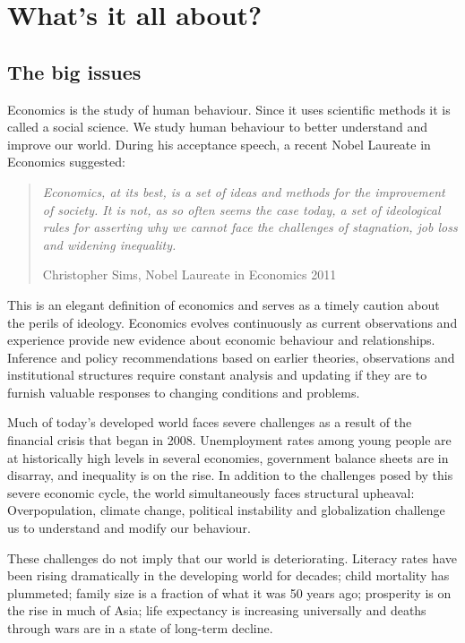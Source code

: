 \section{What's it all about?}\label{sec:ch1sec1}

\subsection*{The big issues}

Economics is the study of human behaviour. Since it uses scientific methods
it is called a social science. We study human behaviour to better understand
and improve our world. During his acceptance speech, a recent Nobel Laureate
in Economics suggested:

\begin{quote}
	\textit{Economics, at its best, is a set of ideas and methods for the
		improvement of society. It is not, as so often seems the case today, a set
		of ideological rules for asserting why we cannot face the challenges of
		stagnation, job loss and widening inequality.}
	
	Christopher Sims, Nobel Laureate in Economics 2011
\end{quote}

This is an elegant definition of economics and serves as a timely caution
about the perils of ideology. Economics evolves continuously as current
observations and experience provide new evidence about economic behaviour
and relationships. Inference and policy recommendations based on earlier
theories, observations and institutional structures require constant
analysis and updating if they are to furnish valuable responses to changing
conditions and problems.

Much of today's developed world faces severe challenges as a result of the
financial crisis that began in 2008. Unemployment rates among young people
are at historically high levels in several economies, government balance
sheets are in disarray, and inequality is on the rise. In addition to the
challenges posed by this severe economic cycle, the world simultaneously
faces structural upheaval: Overpopulation, climate change, political
instability and globalization challenge us to understand and modify our
behaviour.

These challenges do not imply that our world is deteriorating. Literacy
rates have been rising dramatically in the developing world for decades;
child mortality has plummeted; family size is a fraction of what it was 50
years ago; prosperity is on the rise in much of Asia; life expectancy is
increasing universally and deaths through wars are in a state of long-term
decline.


